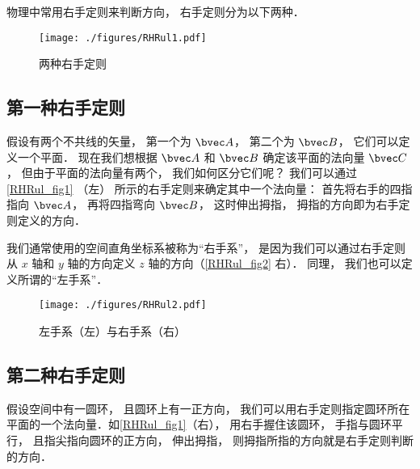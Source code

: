 

物理中常用右手定则来判断方向， 右手定则分为以下两种．

\begin{figure}[ht]
\centering
\texttt{[image: ./figures/RHRul1.pdf]}
\caption{两种右手定则} \label{RHRul_fig1}
\end{figure}

\subsection{第一种右手定则}
假设有两个不共线的矢量， 第一个为 $\bvec A$， 第二个为 $\bvec B$， 它们可以定义一个平面． 现在我们想根据 $\bvec A$ 和 $\bvec B$ 确定该平面的法向量 $\bvec C$， 但由于平面的法向量有两个， 我们如何区分它们呢？ 我们可以通过\autoref{RHRul_fig1} （左） 所示的右手定则来确定其中一个法向量： 首先将右手的四指指向 $\bvec A$， 再将四指弯向 $\bvec B$， 这时伸出拇指， 拇指的方向即为右手定则定义的方向．

我们通常使用的空间直角坐标系被称为“右手系”， 是因为我们可以通过右手定则从 $x$ 轴和 $y$ 轴的方向定义 $z$ 轴的方向（\autoref{RHRul_fig2} 右）． 同理， 我们也可以定义所谓的“左手系”．

\begin{figure}[ht]
\centering
\texttt{[image: ./figures/RHRul2.pdf]}
\caption{左手系（左）与右手系（右）} \label{RHRul_fig2}
\end{figure}

\subsection{第二种右手定则}
假设空间中有一圆环， 且圆环上有一正方向， 我们可以用右手定则指定圆环所在平面的一个法向量．如\autoref{RHRul_fig1}（右）， 用右手握住该圆环， 手指与圆环平行， 且指尖指向圆环的正方向， 伸出拇指， 则拇指所指的方向就是右手定则判断的方向．
